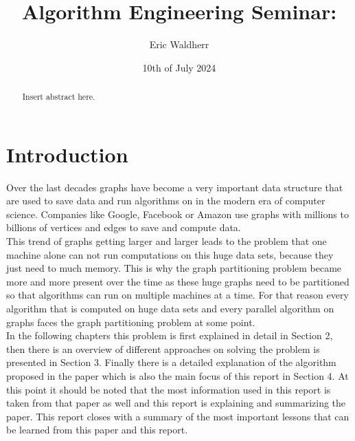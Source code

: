 \documentclass[acmsmall,nonacm,screen,review]{acmart}
\title{Algorithm Engineering Seminar: }
\author{Eric Waldherr}
\affiliation{%
  \institution{Heidelberg University}
  \streetaddress{Im Neuenheimer Feld 205}
  \city{Heidelberg}
  \state{Baden-Württemberg}
  \country{Germany}
  \postcode{69120}
}
\date{10th of July 2024}
\begin{document}
\begin{abstract}
Insert abstract here.
\end{abstract}
\maketitle

\section{Introduction}
Over the last decades graphs have become a very important data structure that are used to save data
and run algorithms on in the modern era of computer science. Companies like Google, Facebook or Amazon use graphs with millions to billions of vertices and edges to save and compute data.\\ 
This trend of graphs getting larger and larger leads to the problem that one machine alone can not run computations on this huge data sets, because they just need to much memory. This is why the graph partitioning problem became more and more present over the time as these huge graphs need to be partitioned so that algorithms can run on multiple machines at a time. For that reason every algorithm that is computed on huge data sets and every parallel algorithm on graphs faces the graph partitioning problem at some point.\\ 
In the following chapters this problem is first explained in detail in Section 2, then there is an overview of different approaches on solving the problem is presented in Section 3. Finally there is a detailed explanation of the algorithm proposed in the paper which is also the main focus of this report in Section 4. At this point it should be noted that the most information used in this report is taken from that paper as well and this report is explaining and summarizing the paper. This report closes with a summary of the most important lessons that can be learned from this paper and this report.
\end{document}
